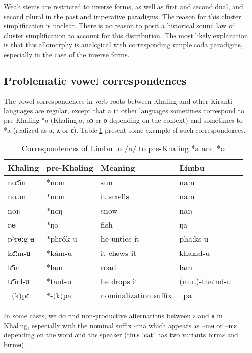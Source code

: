 \documentclass[oldfontcommands,oneside,a4paper,11pt]{article}
\newcommand{\ipa}[1]{{\phon \mbox{#1}}} %
\begin{document}
Weak stems are restricted to inverse forms, as well as first and second dual, and second plural in the past and imperative paradigms. The reason for this cluster simplification is unclear. There is no reason to posit a historical sound law of cluster simplification to account for this distribution. The most likely explanation is that this allomorphy is analogical with corresponding simple coda paradigms, especially in the case of the inverse forms.


\subsection{Problematic vowel correspondences} \label{sec:vowel.correspondences}

The vowel correspondences in verb roots between Khaling and other Kiranti languages are regular, except that \ipa{a} in other languages sometimes correspond to pre-Khaling  \ipa{*o} (Khaling \ipa{o}, \ipa{oɔ} or \ipa{ɵ} depending on the context) and sometimes to  \ipa{*a} (realized as \ipa{a}, \ipa{ʌ} or \ipa{ɛ}). Table \ref{tab:correspondances.a} present some example of such correspondences.
 
\begin{table}[H]
\caption{Correspondences of Limbu to /a/ to pre-Khaling  \ipa{*a} and  \ipa{*o}} \centering \label{tab:correspondances.a}
\begin{tabular}{lllll}
Khaling &   pre-Khaling & Meaning &   Limbu \\
\midrule
\ipa{noɔ̄m} &  \ipa{*nom} & sun &   \ipa{nam}\\
\ipa{noɔ̄m} &  \ipa{*nom} & it smells &   \ipa{nam}\\
\ipa{nōŋ} &  \ipa{*noŋ} & snow&   \ipa{naŋ}\\
\ipa{ŋɵ} &  \ipa{*ŋo} & fish&   \ipa{ŋa}\\
\ipa{pʰrɵ̄ːg-ʉ} &  \ipa{*phrók-u} & he unties it & \ipa{phaːks-u} \\
\midrule
\ipa{kɛ̄ːm-ʉ} &  \ipa{*kám-u} & it chews it & \ipa{khamd-u} \\
\ipa{lɛ̄m} &  \ipa{*lam} & road & \ipa{lam} \\
\ipa{tɛ̄nd-ʉ} & \ipa{*tant-u} & he drops it & \ipa{(mut)-thaːnd-u}\\
\ipa{--(k)pɛ} & \ipa{*-(k)pa} & nominalization suffix & \ipa{--pa} \\
\bottomrule
\end{tabular}
\end{table}
In some cases, we do find non-productive alternations between \ipa{ɛ} and \ipa{ɵ} in Khaling, especially with the nominal suffix \ipa{--ma} which appears as \ipa{--mɵ} or \ipa{--mɛ} depending on the word and the speaker (thus `cat' has two variants \ipa{bīrmɛ} and \ipa{bīrmɵ}). 
\end{document}
